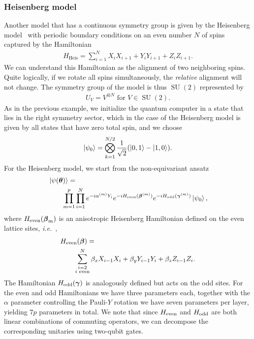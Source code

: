 \documentclass[a4paper,twocolumn,notitlepage,nofootinbib,superscriptaddress,floatfix]{revtex4-2}
\newcommand{\ie}{\textit{i.e.}\ }
\DeclareMathOperator{\SU}{\ensuremath{SU}}
\begin{document}
\subsubsection*{Heisenberg model}
Another model that has a continuous symmetry group is given by the Heisenberg model~\cite{Franchini_2017} with periodic boundary conditions on an even number $N$ of spins captured by the Hamiltonian
\begin{align}
    {H}_{\text{Heis}}=\sum_{i=1}^{N}X_i X_{i+1}+Y_i Y_{i+1}+Z_i Z_{i+1}.
\end{align}
We can understand this Hamiltonian as the alignment of two neighboring spins. Quite logically, if we rotate all spins simultaneously, the \emph{relative} alignment will not change. The symmetry group of the model is thus $\SU(2)$ represented by
\begin{align}
    U_V = V^{\otimes N} \text{ for } V \in \SU(2).
\end{align}
As in the previous example, we initialize the quantum computer in a state that lies in the right symmetry sector, which in the case of the Heisenberg model is given by all states that have zero total spin, and we choose
\begin{align}
    \ket{\psi_0} = \bigotimes_{k=1}^{N/2} \frac{1}{\sqrt{2}}(\ket{0,1} - \ket{1,0}).
\end{align}
For the Heisenberg model, we start from the non-equivariant ansatz
\begin{align}
\begin{split}
&\ket{\psi(\boldsymbol{\theta})}=\\
&\qquad \prod_{m=1}^{p}\prod_{i=1}^{N}e^{-i \alpha^{(m)} Y_i}e^{-i H_{\rm even}(\boldsymbol{\beta}^{(m)})}e^{-i H_{\rm odd}(\boldsymbol{\gamma}^{(m)})}\ket{\psi_0},
\label{eqn:ansatzHeis}
\end{split}
\end{align}
where $H_{\rm even}(\boldsymbol{\beta}_m)$ is an anisotropic Heisenberg Hamiltonian defined on the even lattice sites, 
\ie,
\begin{align}
\begin{split}
    &H_{\rm even}(\boldsymbol{\beta} )= \\
    &\qquad \sum_{\substack{i=2\\i \text{ even}} }^{N} \beta_x X_{i-1} X_{i}+\beta_y Y_{i-1} Y_{i}+ \beta_z Z_{i-1} Z_{i}.
\end{split}
\end{align}
The Hamiltonian $H_{\rm odd}(\boldsymbol{\gamma})$ is analogously defined but acts on the odd sites.
For the even and odd Hamiltonians we have three parameters each, together with the $\alpha$ parameter controlling the Pauli-$Y$ rotation we have seven parameters per layer, yielding $7p$ parameters in total.
We note that since $H_{\rm even}$ and $H_{\rm odd}$ are both linear combinations of commuting operators, we can decompose the corresponding unitaries using two-qubit gates.
\end{document}
